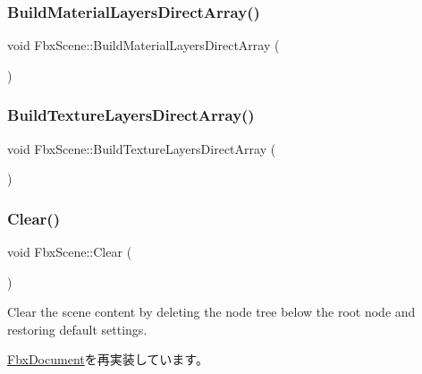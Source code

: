 \subsubsection{\texorpdfstring{Build\+Material\+Layers\+Direct\+Array()}{BuildMaterialLayersDirectArray()}}
{\footnotesize\ttfamily void Fbx\+Scene\+::\+Build\+Material\+Layers\+Direct\+Array (\begin{DoxyParamCaption}{ }\end{DoxyParamCaption})}

\mbox{\label{class_fbx_scene_a27a6d24089178bc992f59787aef9d319}} 
\subsubsection{\texorpdfstring{Build\+Texture\+Layers\+Direct\+Array()}{BuildTextureLayersDirectArray()}}
{\footnotesize\ttfamily void Fbx\+Scene\+::\+Build\+Texture\+Layers\+Direct\+Array (\begin{DoxyParamCaption}{ }\end{DoxyParamCaption})}

\mbox{\label{class_fbx_scene_ab578ff733eb8f6af89ff1645852966cd}} 
\subsubsection{\texorpdfstring{Clear()}{Clear()}}
{\footnotesize\ttfamily void Fbx\+Scene\+::\+Clear (\begin{DoxyParamCaption}{ }\end{DoxyParamCaption})\hspace{0.3cm}{\ttfamily [virtual]}}



Clear the scene content by deleting the node tree below the root node and restoring default settings. 



\hyperlink{class_fbx_document_ac8fa73e98a73c4f6637466e58d069bbe}{Fbx\+Document}を再実装しています。

\mbox{\label{class_fbx_scene_acee728f921bf4e25f6f8accf3446b079}} 
